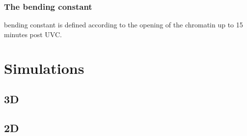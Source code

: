 \documentclass[12pt]{report}
\begin{document}
     \subsubsection{The bending constant}
       bending constant is defined according to the opening of the chromatin up to 15 minutes post UVC. 
     
     



             		
	\section{Simulations}
	
	\subsection{ 3D}
	\subsection{2D}
	
	
	
\end{document}
